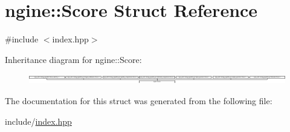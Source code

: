 \hypertarget{structngine_1_1Score}{}\section{ngine\+:\+:Score Struct Reference}
\label{structngine_1_1Score}


{\ttfamily \#include $<$index.\+hpp$>$}

Inheritance diagram for ngine\+:\+:Score\+:\begin{figure}[H]
\begin{center}
\leavevmode
\includegraphics[height=0.427808cm]{structngine_1_1Score}
\end{center}
\end{figure}


The documentation for this struct was generated from the following file\+:\begin{DoxyCompactItemize}
\item 
include/\hyperlink{index_8hpp}{index.\+hpp}\end{DoxyCompactItemize}
